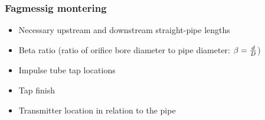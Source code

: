 \documentclass[aspectratio=169,xcolor=dvipsnames]{beamer}
\begin{document}
%
%
\begin{frame}
	\frametitle{Fagmessig montering}

\begin{itemize}
\item Necessary upstream and downstream straight-pipe lengths
\item Beta ratio (ratio of orifice bore diameter to pipe diameter: $\beta = {d \over D}$)
\item Impulse tube tap locations
\item Tap finish
\item Transmitter location in relation to the pipe
\end{itemize}
\end{frame}
\end{document}
